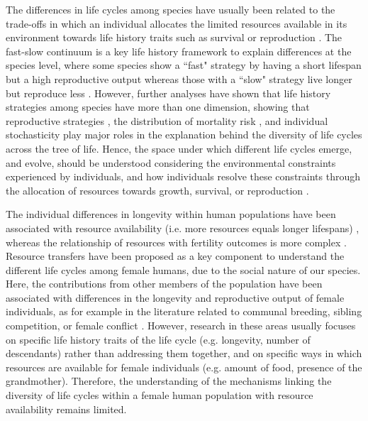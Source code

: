 \documentclass{article}
\begin{document}
The differences in life cycles among species have usually been related to the trade-offs in which an individual allocates the limited resources available in its environment towards life history traits such as survival or reproduction \citep{stearns2000life}. The fast-slow continuum is a key life history framework to explain differences at the species level, where some species show a ``fast" strategy by having a short lifespan but a high reproductive output whereas those with a ``slow" strategy live longer but reproduce less \citep{stearns1983influence}. However, further analyses have shown that life history strategies among species have more than one dimension, showing that reproductive strategies \citep{salguero2016fast}, the distribution of mortality risk \citep{healy2019animal}, and individual stochasticity \citep{varas2022individual} play major roles in the explanation behind the diversity of life cycles across the tree of life. Hence, the space under which different life cycles emerge, and evolve, should be understood considering the environmental constraints experienced by individuals, and how individuals resolve these constraints through the allocation of resources towards growth, survival, or reproduction \citep{white2022metabolic}.

The individual differences in longevity within human populations have been associated with resource availability (i.e. more resources equals longer lifespans) \citep{kaplan2003embodied}, whereas the relationship of resources with fertility outcomes is more complex \citep{mulder1998demographic,sear2016understanding}. Resource transfers have been proposed as a key component to understand the different life cycles among female humans, due to the social nature of our species. Here, the contributions from other members of the population have been associated with differences in the longevity and reproductive output of female individuals, as for example in the literature related to communal breeding, sibling competition, or female conflict \citep{ivey2000cooperative,nitsch2013elder,mace2012female,sear2011much}. However, research in these areas usually focuses on specific life history traits of the life cycle (e.g. longevity, number of descendants) rather than addressing them together, and on specific ways in which resources are available for female individuals (e.g. amount of food, presence of the grandmother). Therefore, the understanding of the mechanisms linking the diversity of life cycles within a female human population with resource availability remains limited.
\end{document}
